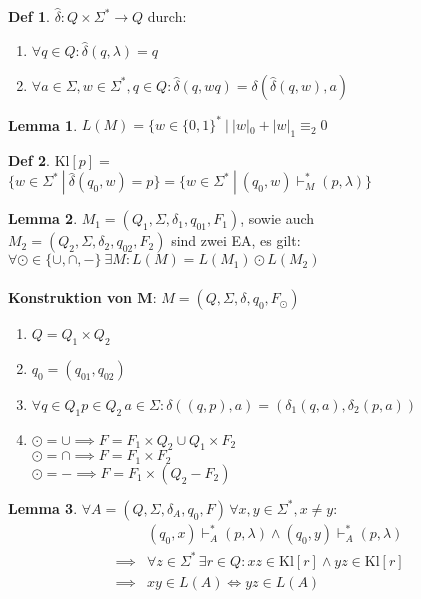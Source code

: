 \documentclass[a4paper, 10pt]{article}
\theoremstyle{definition}
\newtheorem{lemma}{Lemma}[section]
\newtheorem*{definition*}{Def}
\newcommand{\words}{\Sigma^*}
\newcommand{\A}{\Sigma}
\begin{document}
\pagebreak
\begin{definition*}
    \(\hat{\delta}: Q \times \words \to Q\) durch:
    \begin{enumerate}[label=(\roman*)]
        \item \(\forall q \in Q: \hat{\delta}(q, \lambda) = q\)
        \item \(\forall a \in \A, w \in \words, q \in Q: \hat{\delta}(q, wq) = \delta(\hat{\delta}(q, w), a)\)
    \end{enumerate}
\end{definition*}

\begin{lemma}
    \(L(M) = \{w \in \{0, 1\}^* \ | \ |w|_0 + |w|_1 \equiv_2 0\)
\end{lemma}

\begin{definition*} \(\text{Kl}[p] =\) \\
    \(\{w \in \words \ | \ \hat{\delta}(q_0, w) = p\} = \{w \in \words \ | \ (q_0, w) \vdash_M^* (p, \lambda)\}\)
\end{definition*}

\begin{lemma}
    \(M_1 = (Q_1, \A, \delta_1, q_{01}, F_1)\), sowie auch \\ \(M_2 = (Q_2, \A, \delta_2, q_{02}, F_2)\) sind zwei EA, es gilt: \\ 
    \(\forall \odot \in \{\cup, \cap, -\} \ \exists M: L(M) = L(M_1) \odot L(M_2)\) \\ \ \\
    \textbf{Konstruktion von \(\bm{M}\)}: \(M = (Q , \A, \delta, q_0, F_{\odot})\)
    \begin{enumerate}[label=(\roman*)]
        \item \(Q = Q_1 \times Q_2\)
        \item \(q_0 = (q_{01}, q_{02})\)
        \item \(\forall q \in Q_1 p \in Q_2 \, a \in \A: \delta((q, p), a) = (\delta_1(q, a), \delta_2(p, a))\)
        \item \(\odot = \cup \implies F = F_1 \times Q_2 \cup Q_1 \times F_2\) \\
        \(\odot = \cap \implies F = F_1 \times F_2\) \\
        \(\odot = - \implies F = F_1 \times (Q_2 - F_2)\)
    \end{enumerate}
\end{lemma}

\begin{lemma}
    \(\forall A = (Q, \A, \delta_A, q_0, F) \, \forall x, y \in \words, x \neq y: \)
    \begin{align*}
        &(q_0, x) \vdash_A^* (p, \lambda) \land (q_0, y) \vdash_A^* (p, \lambda)\\  
        \implies &\forall z \in \words \, \exists r \in Q: xz \in \text{Kl}[r] \land yz \in \text{Kl}[r] \\
        \implies &xy \in L(A) \iff yz \in L(A)
    \end{align*}
\end{lemma}
\end{document}
